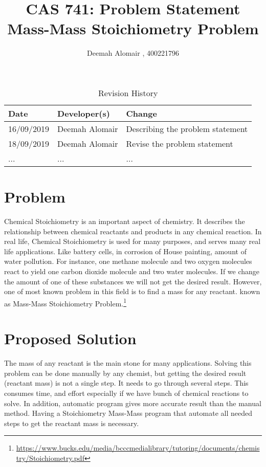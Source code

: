 \documentclass{article}
\title{CAS 741: Problem Statement\\ Mass-Mass Stoichiometry Problem}
\author{Deemah Alomair , 400221796}
\date{}
\begin{document}
\maketitle

\begin{table}[hp]
\caption{Revision History} \label{TblRevisionHistory}
\begin{tabularx}{\textwidth}{llX}
\toprule
\textbf{Date} & \textbf{Developer(s)} & \textbf{Change}\\
\midrule
16/09/2019 & Deemah Alomair & Describing the problem statement \\
18/09/2019 & Deemah Alomair & Revise the problem statement \\


... & ... & ...\\
\bottomrule
\end{tabularx}
\end{table}
\section*{Problem}
Chemical Stoichiometry is an important aspect of chemistry. It describes the relationship between chemical reactants and products in any chemical reaction. In real life, Chemical Stoichiometry is used for many purposes, and serves many real life applications. Like battery cells, in corrosion of House painting, amount of water pollution. For instance, one methane molecule and two oxygen molecules react to yield one carbon dioxide molecule and two water molecules. If we change the amount of one of these substances we will not get the desired result. However, one of most known problem in this field is to find a mass for any reactant. known as Mass-Mass Stoichiometry Problem.\footnote{\url{https://www.bucks.edu/media/bcccmedialibrary/tutoring/documents/chemistry/Stoichiometry.pdf}}
\section*{Proposed Solution}
The mass of any reactant is the main stone for many applications. Solving this problem can be done manually by any chemist, but  getting  the desired result (reactant mass) is not a single step. It needs to go through several steps. This consumes time, and effort especially if we have bunch of chemical reactions to solve. In addition, automatic program gives more accurate result than the manual method. Having a Stoichiometry Mass-Mass program that automate all needed steps to get the reactant mass is necessary. \\
\end{document}
